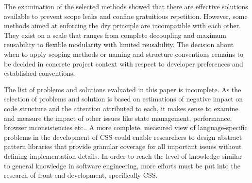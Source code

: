 The examination of the selected methods showed that there are effective solutions available to prevent scope leaks and confine gratuitious repetition.
However, some methods aimed at enforcing the \gls{dry} principle are incompatible with each other.
They exist on a scale that ranges from complete decoupling and maximum reusability to flexible modularity with limited reusability.
The decision about when to apply scoping methods or naming and structure conventions remains to be decided in concrete project context with respect to developer preferences and established conventions.

The list of problems and solutions evaluated in this paper is incomplete.
As the selection of problems and solution is based on estimations of negative impact on code structure and the attention attributed to each, it makes sense to examine and measure the impact of other issues like state management, performance, browser inconsistencies etc..
A more complete, measured view of language-specific problems in the development of CSS could enable researchers to design abstract pattern libraries that provide granular coverage for all important issues without defining implementation details.
In order to reach the level of knowledge similar to general knowledge in software engineering, more efforts must be put into the research of front-end development, specifically CSS.
